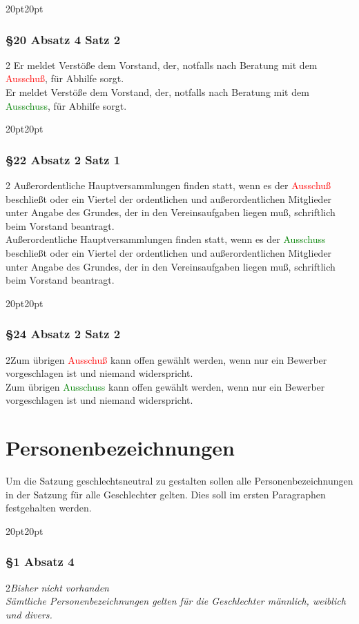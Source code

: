 \documentclass[10pt,a4paper,parskip=half]{scrartcl}
\newcommand{\new}[1]{\textcolor{Green}{#1}}
\newcommand{\old}[1]{\textcolor{Red}{#1}}
\newcommand{\change}[1]{
  \begin{adjustwidth}{20pt}{20pt}
    #1
  \end{adjustwidth}
}
\newcommand{\compare}[3]{\change{\subsubsection*{#1}\begin{multicols}{2}#2\columnbreak\\#3\end{multicols}}}
\begin{document}
  \compare{§20 Absatz 4 Satz 2}{
    Er meldet Verstöße dem Vorstand, der, notfalls nach Beratung mit dem \old{Ausschuß}, für Abhilfe sorgt.
  }{
    Er meldet Verstöße dem Vorstand, der, notfalls nach Beratung mit dem \new{Ausschuss}, für Abhilfe sorgt.
  }

  \compare{§22 Absatz 2 Satz 1}
   {
    Außerordentliche Hauptversammlungen finden statt,
    wenn es der \old{Ausschuß} beschließt oder ein Viertel der ordentlichen und außerordentlichen Mitglieder unter Angabe des Grundes,
    der in den Vereinsaufgaben liegen muß,
    schriftlich beim Vorstand beantragt.
    }
   {
    Außerordentliche Hauptversammlungen finden statt,
    wenn es der \new{Ausschuss} beschließt oder ein Viertel der ordentlichen und außerordentlichen Mitglieder unter Angabe des Grundes,
    der in den Vereinsaufgaben liegen muß,
    schriftlich beim Vorstand beantragt.
    }

  \compare{§24 Absatz 2 Satz 2}
  {Zum übrigen \old{Ausschuß} kann offen gewählt werden, wenn nur ein Bewerber vorgeschlagen ist und niemand widerspricht.}
  {Zum übrigen \new{Ausschuss} kann offen gewählt werden, wenn nur ein Bewerber vorgeschlagen ist und niemand widerspricht.}
  \clearpage
  \section{Personenbezeichnungen}
  Um die Satzung geschlechtsneutral zu gestalten sollen alle Personenbezeichnungen in der Satzung für alle Geschlechter gelten. Dies soll im ersten Paragraphen festgehalten werden.

  \compare{§1 Absatz 4}{\em Bisher nicht vorhanden \em}{Sämtliche Personenbezeichnungen gelten für die Geschlechter männlich, weiblich und divers.}

  \clearpage
\end{document}
